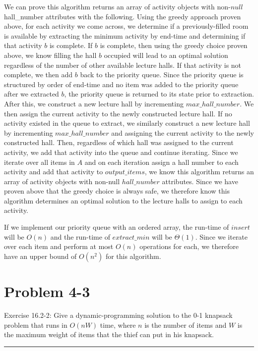 \documentclass[11pt]{article}
\def\separateline{\medskip\hrule\medskip}
\begin{document}
We can prove this algorithm returns an array of activity objects with non-$null$ hall\_number attributes with the following. Using the greedy approach proven above, for each activity we come across, we determine if a previously-filled room is available by extracting the minimum activity by end-time and determining if that activity $b$ is complete. If $b$ is complete, then using the greedy choice proven above, we know filling the hall $b$ occupied will lead to an optimal solution regardless of the number of other available lecture halls. If that activity is not complete, we then add $b$ back to the priority queue. Since the priority queue is structured by order of end-time and no item was added to the priority queue after we extracted $b$, the priority queue is returned to its state prior to extraction. After this, we construct a new lecture hall by incrementing $max\_hall\_number$. We then assign the current activity to the newly constructed lecture hall. If no activity existed in the queue to extract, we similarly construct a new lecture hall by incrementing $max\_hall\_number$ and assigning the current activity to the newly constructed hall. Then, regardless of which hall was assigned to the current activity, we add that activity into the queue and continue iterating. Since we iterate over all items in $A$ and on each iteration assign a hall number to each activity and add that activity to $output\_items$, we know this algorithm returns an array of activity objects with non-null $hall\_number$ attributes. Since we have proven above that the greedy choice is always safe, we therefore know this algorithm determines an optimal solution to the lecture halls to assign to each activity.

If we implement our priority queue with an ordered array, the run-time of $insert$ will be $O(n)$ and the run-time of $extract\_min$ will be $\Theta(1)$. Since we iterate over each item and perform at most $O(n)$ operations for each, we therefore have an upper bound of $O(n^2)$ for this algorithm.

\newpage

\section{Problem 4-3}
Exercise 16.2-2: Give a dynamic-programming solution to the 0-1 knapsack problem that runs in $O(nW)$ time, where $n$ is the number of items and $W$ is the maximum weight of items that the thief can put in his knapsack.
\separateline
\end{document}
